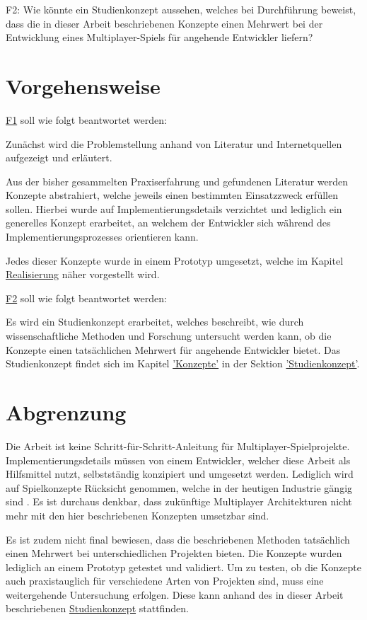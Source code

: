 \label{f2} \textsf{\Large F2:} Wie könnte ein Studienkonzept aussehen, welches bei Durchführung beweist, dass die in dieser Arbeit beschriebenen Konzepte einen Mehrwert bei der Entwicklung eines Multiplayer-Spiels für angehende Entwickler liefern?


\section{Vorgehensweise}

\hyperref[f1]{F1} soll wie folgt beantwortet werden:

Zunächst wird die Problemstellung anhand von Literatur und Internetquellen aufgezeigt und erläutert. 

Aus der bisher gesammelten Praxiserfahrung und gefundenen Literatur werden Konzepte abstrahiert, welche jeweils einen bestimmten Einsatzzweck erfüllen sollen. Hierbei wurde auf Implementierungsdetails verzichtet und lediglich ein generelles Konzept erarbeitet, an welchem der Entwickler sich während des Implementierungsprozesses orientieren kann.

Jedes dieser Konzepte wurde in einem Prototyp umgesetzt, welche im Kapitel \hyperref[sec:realisierung]{Realisierung} näher vorgestellt wird.

\hyperref[f2]{F2} soll wie folgt beantwortet werden:

Es wird ein Studienkonzept erarbeitet, welches beschreibt, wie durch wissenschaftliche Methoden und Forschung untersucht werden kann, ob die Konzepte einen tatsächlichen Mehrwert für angehende Entwickler bietet. Das Studienkonzept findet sich im Kapitel \hyperref[sec:konzepte]{'Konzepte'} in der Sektion \hyperref[studienkonzept]{'Studienkonzept'}.

\section{Abgrenzung}

Die Arbeit ist keine Schritt-für-Schritt-Anleitung für Multiplayer-Spielprojekte. Implementierungsdetails müssen von einem Entwickler, welcher diese Arbeit als Hilfsmittel nutzt, selbstständig konzipiert und umgesetzt werden. Lediglich wird auf Spielkonzepte Rücksicht genommen, welche in der heutigen Industrie gängig sind \cite{Wikipedia.2021b}. Es ist durchaus denkbar, dass zukünftige Multiplayer Architekturen nicht mehr mit den hier beschriebenen Konzepten umsetzbar sind.

Es ist zudem nicht final bewiesen, dass die beschriebenen Methoden tatsächlich einen Mehrwert bei unterschiedlichen Projekten bieten. Die Konzepte wurden lediglich an einem Prototyp getestet und validiert. Um zu testen, ob die Konzepte auch praxistauglich für verschiedene Arten von Projekten sind, muss eine weitergehende Untersuchung erfolgen. Diese kann anhand des in dieser Arbeit beschriebenen \hyperref[studienkonzept]{Studienkonzept} stattfinden. 

